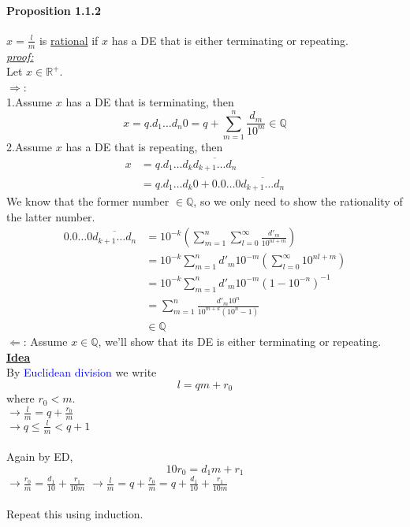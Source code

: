 \documentclass[11pt]{article}
\newcommand{\real}[0]{\mathbb{R}}
\newcommand{\under}[1]{\underline{#1}}
\newcommand{\proof}[0]{\textit{\underline{proof:} }}
\newcommand{\rational}[0]{\mathbb{Q}}
\begin{document}
\paragraph{Proposition 1.1.2} $x = \frac{l}{m}$ is \under{rational} if $x$ has a DE that is either terminating or repeating. \\
\proof\\
Let $x \in \real^+$. \\
$\Rightarrow$: \\
1.Assume $x$ has a DE that is terminating, then
$$x = q.d_1\hdots d_n 0 = q + \sum_{m=1}^n \frac{d_m}{10^m} \in \mathbb{Q}$$
2.Assume $x$ has a DE that is repeating, then
\begin{align*}
	x &= q.d_1\hdots d_k \overline{d_{k+1}\hdots d_n} \\
	&= q.d_1 \hdots d_k 0 + 0.0\hdots0 \overline{d_{k+1}\hdots d_n}
\end{align*}
We know that the former number $\in \mathbb{Q}$, so we only need to show the rationality of the latter number.
\begin{align*}
	0.0\hdots0 \overline{d_{k+1}\hdots d_n} &= 10^{-k}(\sum_{m=1}^n\sum_{l=0}^{\infty} \frac{d'_m}{10^{nl+m}}) \tag{denote $d'_0, \hdots, d'_n$ be the repeated digits}\\
	&= 10^{-k}\sum_{m=1}^n d'_m 10^{-m}(\sum_{l=0}^{\infty}10^{nl+m}) \tag{decompose}\\
	&= 10^{-k} \sum_{m=1}^n d'_m 10^{-m}(1-10^{-n})^{-1} \tag{geometric series} \\
	&= \sum_{m=1}^n \frac{d'_m 10^n}{10^{m+k}(10^n - 1)} \tag{make it look nicer} \\
	&\in \mathbb{Q}
\end{align*}
$\Leftarrow$: Assume $x \in \rational$, we'll show that its DE is either terminating or repeating. \\
\textbf{\under{Idea}} \\
By \textcolor{blue}{Euclidean division} we write
$$l = qm + r_0$$
where $r_0 < m$. \\
$\rightarrow \frac{l}{m} = q + \frac{r_0}{m}$\\
$\rightarrow q \leq \frac{l}{m} < q+1$ \\\\
Again by ED,
$$10r_0 = d_1m + r_1$$
$\rightarrow \frac{r_0}{m} = \frac{d_1}{10} + \frac{r_1}{10m}$
$\rightarrow \frac{l}{m} = q + \frac{r_0}{m} = q + \frac{d_1}{10} + \frac{r_1}{10m}$\\\\
Repeat this using induction.\\
\end{document}
